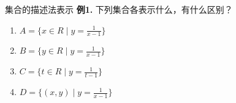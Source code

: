 \documentclass[10pt,
	aspectratio=169,%
	hyperref={colorlinks,
		citecolor=peking_blue,
		urlcolor=peking_blue,
		linkcolor=},
	t,%
	]{beamer}
\theoremstyle{plain}
\begin{document}
\begin{frame}[t]{集合的描述法表示}
	\textbf{例1.} 下列集合各表示什么，有什么区别？
	\begin{enumerate}
		\item $A = \{ x \in R \;| \; y = \frac{1}{x-1}\}$
		\item $B = \{ y \in R \; | \; y = \frac{1}{x-1}\}$
		\item $C = \{ t \in R \; | \; y = \frac{1}{t-1}\}$
		\item $D = \{ (x,y) \; | \; y = \frac{1}{x-1}\}$
	\end{enumerate}
\end{frame}
\end{document}
